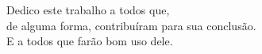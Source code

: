 
\begin{dedicatoria}
	\vspace*{\fill}
	\begin{flushright}
		Dedico este trabalho a todos que, \\
        de alguma forma, contribuíram para sua conclusão. \\
		E a todos que farão bom uso dele.
	\end{flushright}
\end{dedicatoria}